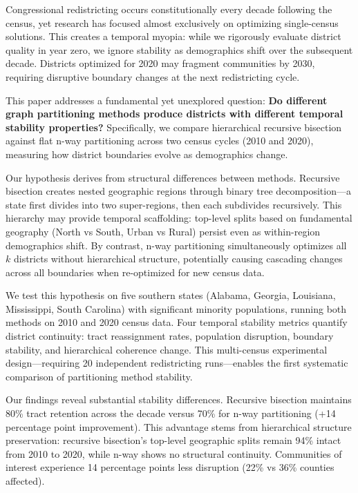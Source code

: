 Congressional redistricting occurs constitutionally every decade following the census, yet research has focused almost exclusively on optimizing single-census solutions. This creates a temporal myopia: while we rigorously evaluate district quality in year zero, we ignore stability as demographics shift over the subsequent decade. Districts optimized for 2020 may fragment communities by 2030, requiring disruptive boundary changes at the next redistricting cycle.

This paper addresses a fundamental yet unexplored question: \textbf{Do different graph partitioning methods produce districts with different temporal stability properties?} Specifically, we compare hierarchical recursive bisection against flat n-way partitioning across two census cycles (2010 and 2020), measuring how district boundaries evolve as demographics change.

Our hypothesis derives from structural differences between methods. Recursive bisection creates nested geographic regions through binary tree decomposition—a state first divides into two super-regions, then each subdivides recursively. This hierarchy may provide temporal scaffolding: top-level splits based on fundamental geography (North vs South, Urban vs Rural) persist even as within-region demographics shift. By contrast, n-way partitioning simultaneously optimizes all $k$ districts without hierarchical structure, potentially causing cascading changes across all boundaries when re-optimized for new census data.

We test this hypothesis on five southern states (Alabama, Georgia, Louisiana, Mississippi, South Carolina) with significant minority populations, running both methods on 2010 and 2020 census data. Four temporal stability metrics quantify district continuity: tract reassignment rates, population disruption, boundary stability, and hierarchical coherence change. This multi-census experimental design—requiring 20 independent redistricting runs—enables the first systematic comparison of partitioning method stability.

Our findings reveal substantial stability differences. Recursive bisection maintains 80\% tract retention across the decade versus 70\% for n-way partitioning (+14 percentage point improvement). This advantage stems from hierarchical structure preservation: recursive bisection's top-level geographic splits remain 94\% intact from 2010 to 2020, while n-way shows no structural continuity. Communities of interest experience 14 percentage points less disruption (22\% vs 36\% counties affected).

